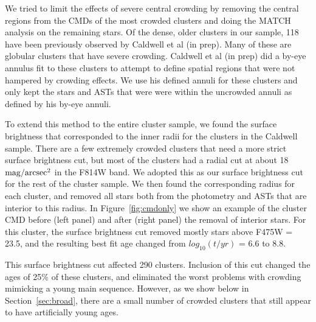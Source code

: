 \documentclass{emulateapj}
\begin{document}
We tried to limit the effects of severe central crowding by removing the central regions from the CMDs of the most crowded clusters and doing the MATCH analysis on the remaining stars.  Of the dense, older clusters in our sample, 118 have been previously observed by Caldwell et al (in prep).  Many of these are globular clusters that have severe crowding.  Caldwell et al (in prep) did a by-eye annulus fit to these clusters to attempt to define spatial regions that were not hampered by crowding effects.  We use his defined annuli for these clusters and only kept the stars  and ASTs that were were within the uncrowded annuli as defined by his by-eye annuli.

To extend this method to the entire cluster sample, we found the surface brightness that corresponded to the inner radii for the clusters in the Caldwell sample.  There are a few extremely crowded clusters that need a more strict surface brightness cut, but most of the clusters had a radial cut at about 18 ${\rm mag/arcsec^2}$ in the F814W band.  We adopted this as our surface brightness cut for the rest of the cluster sample.  We then found the corresponding radius for each cluster, and removed all stars both from the photometry and ASTs that are interior to this radius.  In Figure~\ref{fig:cmdonly} we show an example of the cluster CMD before (left panel) and after (right panel) the removal of interior stars.  For this cluster, the surface brightness cut removed mostly stars above F475W = 23.5, and the resulting best fit age changed from $log_{10} (t/yr)$ = 6.6 to 8.8.  






This surface brightness cut affected 290 clusters.  Inclusion of this cut changed the ages of 25\% of these clusters, and eliminated the worst problems with crowding mimicking a young main sequence.  However, as we show below in Section~\ref{sec:broad}, there are a small number of crowded clusters that still appear to have artificially young ages.
\end{document}
